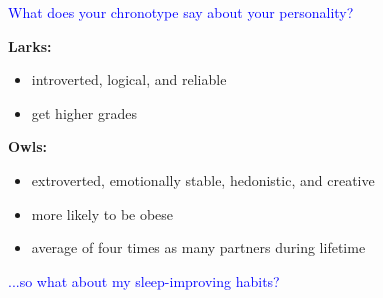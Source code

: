 \documentclass[landscape]{slides}
\begin{document}
\begin{slide}

    \textcolor{blue}{\Large{What does your chronotype say about your personality?}}

    \textbf{Larks:}

    \begin{itemize}
        \item introverted, logical, and reliable
        \item get higher grades
    \end{itemize}

    \textbf{Owls:}

    \begin{itemize}
        \item extroverted, emotionally stable, hedonistic, and creative
        \item more likely to be obese
        \item average of four times as many partners during lifetime
    \end{itemize}

\end{slide}


\begin{slide}

    \textcolor{blue}{\Large{...so what about my sleep-improving habits?}}

\end{slide}
\end{document}

